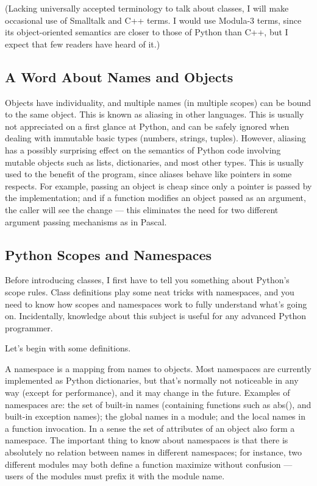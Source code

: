 \documentclass[12pt,a4paper]{article}
\begin{document}
(Lacking universally accepted terminology to talk about classes, I will make occasional use of Smalltalk and C++ terms. I would use Modula-3 terms, since its object-oriented semantics are closer to those of Python than C++, but I expect that few readers have heard of it.)

\subsection{A Word About Names and Objects}
Objects have individuality, and multiple names (in multiple scopes) can be bound to the same object. This is known as aliasing in other languages. This is usually not appreciated on a first glance at Python, and can be safely ignored when dealing with immutable basic types (numbers, strings, tuples). However, aliasing has a possibly surprising effect on the semantics of Python code involving mutable objects such as lists, dictionaries, and most other types. This is usually used to the benefit of the program, since aliases behave like pointers in some respects. For example, passing an object is cheap since only a pointer is passed by the implementation; and if a function modifies an object passed as an argument, the caller will see the change — this eliminates the need for two different argument passing mechanisms as in Pascal.

\subsection{Python Scopes and Namespaces}

Before introducing classes, I first have to tell you something about Python’s scope rules. Class definitions play some neat tricks with namespaces, and you need to know how scopes and namespaces work to fully understand what’s going on. Incidentally, knowledge about this subject is useful for any advanced Python programmer.

Let’s begin with some definitions.

A namespace is a mapping from names to objects. Most namespaces are currently implemented as Python dictionaries, but that’s normally not noticeable in any way (except for performance), and it may change in the future. Examples of namespaces are: the set of built-in names (containing functions such as abs(), and built-in exception names); the global names in a module; and the local names in a function invocation. In a sense the set of attributes of an object also form a namespace. The important thing to know about namespaces is that there is absolutely no relation between names in different namespaces; for instance, two different modules may both define a function maximize without confusion — users of the modules must prefix it with the module name.
\end{document}
